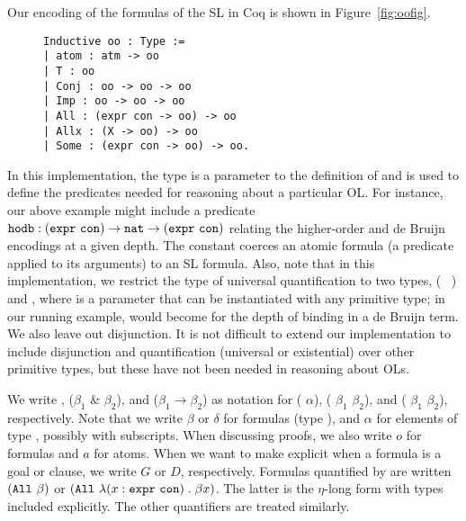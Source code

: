 Our encoding of the formulas of the SL in Coq is shown in
Figure~\ref{fig:oofig}.
%
\begin{figure}
\begin{lstlisting}
Inductive oo : Type :=
| atom : atm -> oo
| T : oo
| Conj : oo -> oo -> oo
| Imp : oo -> oo -> oo
| All : (expr con -> oo) -> oo
| Allx : (X -> oo) -> oo
| Some : (expr con -> oo) -> oo.
\end{lstlisting}
\end{figure}
%
In this implementation, the type  is a parameter to the
definition of  and is used to define the predicates needed for
reasoning about a particular OL.  For instance, our above example
might include a predicate $\texttt{hodb} : (\texttt{expr}~ \texttt{con})
\rightarrow \texttt{nat} \rightarrow (\texttt{expr}~ \texttt{con})$
relating the higher-order and de Bruijn encodings at a given depth.
The constant  coerces an atomic formula (a predicate
applied to its arguments) to an SL formula.  Also, note that in this
implementation, we restrict the type of universal quantification to
two types, (~ ) and , where  is a
parameter that can be instantiated with any primitive type; in our
running example,  would become  for the depth of
binding in a de Bruijn term.  We also leave out disjunction.  It is
not difficult to extend our implementation to include disjunction and
quantification (universal or existential) over other primitive types,
but these have not been needed in reasoning about OLs.

We write \atom{\alpha}, ($\beta_1$ \& $\beta_2$), and ($\beta_1
\longrightarrow \beta_2$) as notation for ( $\alpha$),
( $\beta_1$ $\beta_2$), and ( $\beta_1$
$\beta_2$), respectively.  Note that we write $\beta$ or $\delta$ for
formulas (type ), and $\alpha$ for elements of type
, possibly with subscripts.  When discussing proofs, we also
write $o$ for formulas and $a$ for atoms.  When we want to make
explicit when a formula is a goal or clause, we write $G$ or $D$,
respectively.  Formulas quantified by  are written
$(\texttt{All}~ \beta)$ or $(\texttt{All}~ \lambda (x:\texttt{expr}~
\texttt{con}) \; . \; \beta x)$.  The latter is the $\eta$-long form
with types included explicitly.  The other quantifiers are treated
similarly.

